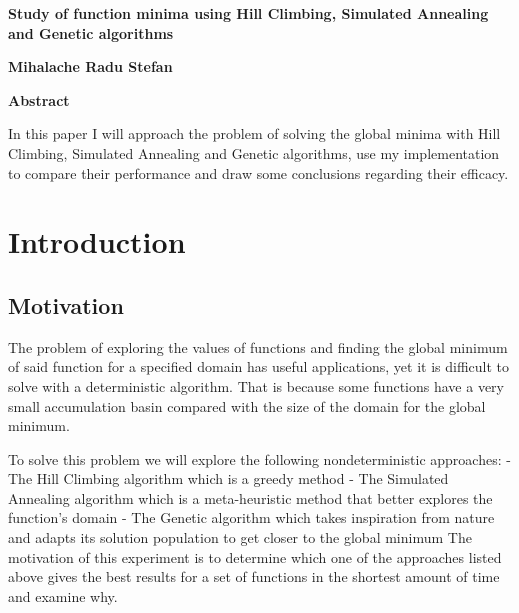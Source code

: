 \documentclass{report}
\author{Mihalache Radu-Stefan}
\date{}
\title{}
\begin{document}
\begin{center}
\Large
\textbf{Study of function minima using Hill Climbing, Simulated Annealing and Genetic algorithms}
        
\vspace{0.4cm}
\textbf{Mihalache Radu Stefan}
       
\vspace{1.2cm}
\textbf{Abstract}

\end{center}

\vspace{0.4cm}
In this paper I will approach the problem of solving the global minima with Hill Climbing,  Simulated Annealing and Genetic algorithms,
use my implementation to compare their performance and draw some conclusions regarding their efficacy.


\section*{Introduction}
\subsection*{Motivation}
The problem of exploring the values of functions and finding the global minimum of said function for a specified domain has useful applications, yet it is difficult to solve with a deterministic algorithm.
That is because some functions have a very small accumulation basin compared with the size of the domain for the global minimum.

\begin{figure}[!h]
  \centering
{}
\end{figure}
\pagebreak

To solve this problem we will explore the following nondeterministic approaches:
\newline
\hspace*{10mm} - The Hill Climbing algorithm which is a greedy method
\newline
\hspace*{10mm} - The Simulated Annealing algorithm which is a meta-heuristic method that better explores the function's domain
\newline
\hspace*{10mm} - The Genetic algorithm which takes inspiration from nature and adapts its solution population to get closer to the global minimum
\newline
\newline
The motivation of this experiment is to determine which one of the approaches listed above gives 
the best results for a set of functions  in the shortest amount of time and examine why. 
\end{document}
